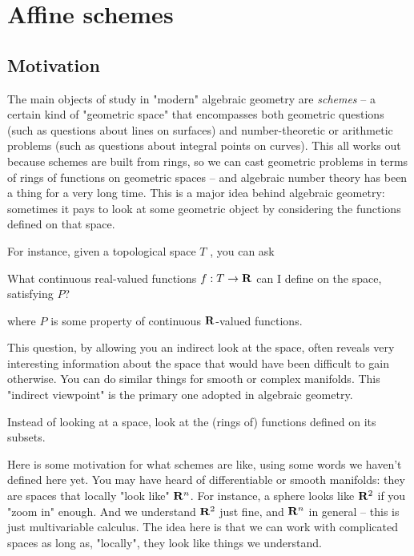 \chapter{Affine schemes}

\section{Motivation}
\label{sec:motivation-for-affine-schemes}

The main objects of study in "modern" algebraic geometry are \emph{schemes} -- a
certain kind of "geometric space" that encompasses both geometric questions
(such as questions about lines on surfaces) and number-theoretic or arithmetic
problems (such as questions about integral points on curves). This all works out
because schemes are built from rings, so we can cast geometric problems in terms
of rings of functions on geometric spaces -- and algebraic number theory has
been a thing for a very long time. This is a major idea behind algebraic
geometry: sometimes it pays to look at some geometric object by considering the
functions defined on that space.

\medskip\noindent For instance, given a topological space $T$ , you can ask

\begin{question}
  What continuous real-valued functions $f:T\to\mathbf{R}$ can I define on the space,
  satisfying $P$?
\end{question}
where $P$ is some property of continuous $\mathbf{R}$-valued functions.

\medskip\noindent This question, by allowing you an indirect look at the space,
often reveals very interesting information about the space that would have been
difficult to gain otherwise. You can do similar things for smooth or complex
manifolds. This "indirect viewpoint" is the primary one adopted in algebraic
geometry.

\begin{slogan}
  Instead of looking at a space, look at the (rings of) functions defined on its
  subsets.
\end{slogan}

Here is some motivation for what schemes are like, using some words we haven't
defined here yet. You may have heard of differentiable or smooth manifolds: they
are spaces that locally "look like" $\mathbf{R}^n$. For instance, a sphere looks like
$\mathbf{R}^2$ if you "zoom in" enough. And we understand $\mathbf{R}^2$ just fine, and
$\mathbf{R}^n$ in general -- this is just multivariable calculus. The idea here is that
we can work with complicated spaces as long as, "locally", they look like things
we understand.


